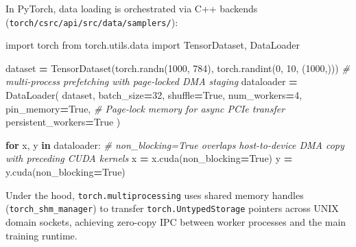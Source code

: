 \documentclass[
  letterpaper,
]{scrbook}
\newenvironment{Shaded}{\begin{snugshade}}{\end{snugshade}}
\newcommand{\CommentTok}[1]{\textcolor[rgb]{0.56,0.35,0.01}{\textit{#1}}}
\newcommand{\ControlFlowTok}[1]{\textcolor[rgb]{0.13,0.29,0.53}{\textbf{#1}}}
\newcommand{\DecValTok}[1]{\textcolor[rgb]{0.00,0.00,0.81}{#1}}
\newcommand{\ImportTok}[1]{#1}
\newcommand{\KeywordTok}[1]{\textcolor[rgb]{0.13,0.29,0.53}{\textbf{#1}}}
\newcommand{\NormalTok}[1]{#1}
\newcommand{\OperatorTok}[1]{\textcolor[rgb]{0.81,0.36,0.00}{\textbf{#1}}}
\newcommand{\VariableTok}[1]{\textcolor[rgb]{0.00,0.00,0.00}{#1}}
\begin{document}
\begin{tcolorbox}[enhanced jigsaw, arc=.35mm, bottomrule=.15mm, bottomtitle=1mm, breakable, colback=white, colbacktitle=quarto-callout-note-color!10!white, colframe=quarto-callout-note-color-frame, coltitle=black, left=2mm, leftrule=.75mm, opacityback=0, opacitybacktitle=0.6, rightrule=.15mm, title=\textcolor{quarto-callout-note-color}{\faInfo}\hspace{0.5em}{PyTorch Systems Bridge: \texttt{torch.utils.data.DataLoader} and
\texttt{torch::DataLoader}}, titlerule=0mm, toprule=.15mm, toptitle=1mm]

In PyTorch, data loading is orchestrated via C++ backends
(\texttt{torch/csrc/api/src/data/samplers/}):

\begin{Shaded}
\begin{Highlighting}[]
\ImportTok{import}\NormalTok{ torch}
\ImportTok{from}\NormalTok{ torch.utils.data }\ImportTok{import}\NormalTok{ TensorDataset, DataLoader}

\NormalTok{dataset }\OperatorTok{=}\NormalTok{ TensorDataset(torch.randn(}\DecValTok{1000}\NormalTok{, }\DecValTok{784}\NormalTok{), torch.randint(}\DecValTok{0}\NormalTok{, }\DecValTok{10}\NormalTok{, (}\DecValTok{1000}\NormalTok{,)))}
\CommentTok{\# multi{-}process prefetching with page{-}locked DMA staging}
\NormalTok{dataloader }\OperatorTok{=}\NormalTok{ DataLoader(}
\NormalTok{    dataset,}
\NormalTok{    batch\_size}\OperatorTok{=}\DecValTok{32}\NormalTok{,}
\NormalTok{    shuffle}\OperatorTok{=}\VariableTok{True}\NormalTok{,}
\NormalTok{    num\_workers}\OperatorTok{=}\DecValTok{4}\NormalTok{,}
\NormalTok{    pin\_memory}\OperatorTok{=}\VariableTok{True}\NormalTok{,      }\CommentTok{\# Page{-}lock memory for async PCIe transfer}
\NormalTok{    persistent\_workers}\OperatorTok{=}\VariableTok{True}
\NormalTok{)}

\ControlFlowTok{for}\NormalTok{ x, y }\KeywordTok{in}\NormalTok{ dataloader:}
    \CommentTok{\# non\_blocking=True overlaps host{-}to{-}device DMA copy with preceding CUDA kernels}
\NormalTok{    x }\OperatorTok{=}\NormalTok{ x.cuda(non\_blocking}\OperatorTok{=}\VariableTok{True}\NormalTok{)}
\NormalTok{    y }\OperatorTok{=}\NormalTok{ y.cuda(non\_blocking}\OperatorTok{=}\VariableTok{True}\NormalTok{)}
\end{Highlighting}
\end{Shaded}

Under the hood, \texttt{torch.multiprocessing} uses shared memory
handles (\texttt{torch\_shm\_manager}) to transfer
\texttt{torch.UntypedStorage} pointers across UNIX domain sockets,
achieving zero-copy IPC between worker processes and the main training
runtime.\footnotemark{}

\end{tcolorbox}
\end{document}
